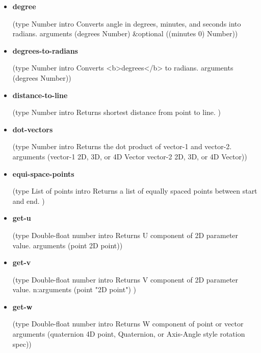 \documentclass [11pt]{book}
\begin{document}
\begin{itemize}
\item {}
\label{prim:degree}
\textbf{degree}

(type Number intro
  Converts angle in degrees, minutes, and seconds into radians.
 arguments (degrees Number) \&optional ((minutes 0) Number))



\item {}
\label{prim:degrees-to-radians}
\textbf{degrees-to-radians}

(type Number intro  Converts <b>degrees</b> to radians.
 arguments (degrees Number))



\item {}
\label{prim:distance-to-line}
\textbf{distance-to-line}

(type Number intro  Returns shortest distance from point to line.
)



\item {}
\label{prim:dot-vectors}
\textbf{dot-vectors}

(type Number intro  Returns the dot product of vector-1 and vector-2.
 arguments
 (vector-1 2D, 3D, or 4D Vector vector-2 2D, 3D, or 4D Vector))



\item {}
\label{prim:equi-space-points}
\textbf{equi-space-points}

(type List of points intro
  Returns a list of equally spaced points between start and end.
)



\item {}
\label{prim:get-u}
\textbf{get-u}

(type Double-float number intro
  Returns U component of 2D parameter value.
 arguments (point 2D point))



\item {}
\label{prim:get-v}
\textbf{get-v}

(type Double-float number intro
  Returns V component of 2D parameter value.
n:arguments (point "2D point")
)



\item {}
\label{prim:get-w}
\textbf{get-w}

(type Double-float number intro  Returns W component of point or vector
 arguments
 (quaternion 4D point, Quaternion, or Axis-Angle style rotation spec))




\end{itemize}
\end{document}

